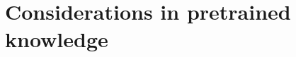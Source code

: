 \graphicspath{ {images/} }






\lstset{basicstyle=\ttfamily,columns=flexible,numbers=none}

\section{Considerations in pretrained knowledge}

